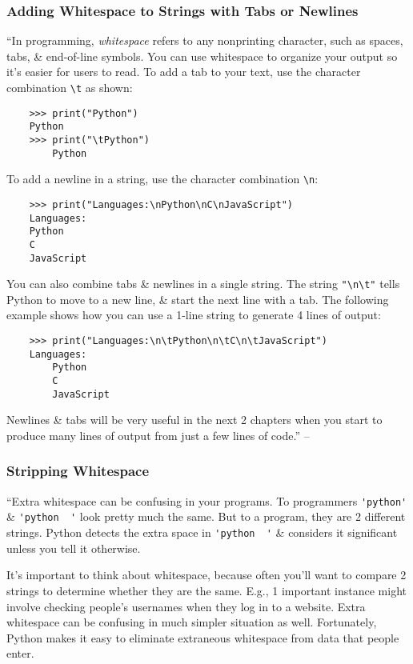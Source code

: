 \documentclass[oneside]{book}
\numberwithin{equation}{section}
\begin{document}
\subsubsection{Adding Whitespace to Strings with Tabs or Newlines}
``In programming, \textit{whitespace} refers to any nonprinting character, such as spaces, tabs, \& end-of-line symbols. You can use whitespace to organize your output so it's easier for users to read. To add a tab to your text, use the character combination \verb|\t| as shown:
\begin{verbatim}
	>>> print("Python")
	Python
	>>> print("\tPython")
	    Python
\end{verbatim}
To add a newline in a string, use the character combination \verb|\n|:
\begin{verbatim}
	>>> print("Languages:\nPython\nC\nJavaScript")
	Languages:
	Python
	C
	JavaScript
\end{verbatim}
You can also combine tabs \& newlines in a single string. The string \verb|"\n\t"| tells Python to move to a new line, \& start the next line with a tab. The following example shows how you can use a 1-line string to generate 4 lines of output:
\begin{verbatim}
	>>> print("Languages:\n\tPython\n\tC\n\tJavaScript")
	Languages:
	    Python
	    C
	    JavaScript
\end{verbatim}
Newlines \& tabs will be very useful in the next 2 chapters when you start to produce many lines of output from just a few lines of code.'' -- \cite[p. 22]{Matthes2019}

\subsubsection{Stripping Whitespace}
``Extra whitespace can be confusing in your programs. To programmers \verb|'python'| \& \verb|'python  '| look pretty much the same. But to a program, they are 2 different strings. Python detects the extra space in \verb|'python  '| \& considers it significant unless you tell it otherwise.

It's important to think about whitespace, because often you'll want to compare 2 strings to determine whether they are the same. E.g., 1 important instance might involve checking people's usernames when they log in to a website. Extra whitespace can be confusing in much simpler situation as well. Fortunately, Python makes it easy to eliminate extraneous whitespace from data that people enter.
\end{document}
